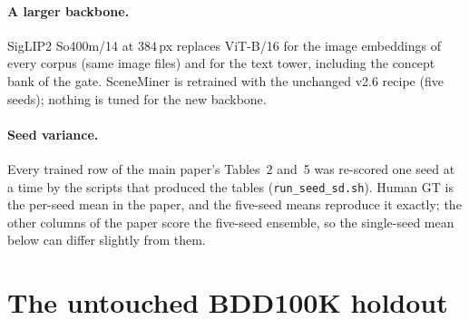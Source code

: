 \documentclass[10pt,letterpaper]{article}
\begin{document}
\begin{table}[!ht]\centering\small
\caption{\textbf{SigLIP2 top-50 $\rightarrow$ Qwen2.5-VL per query}, mAP, against
SceneMiner (holdout: portable mode, as in Table~2). $\Delta$: SceneMiner minus reranker.}
\label{tab:vlmrr}
\resizebox{0.85\textwidth}{!}{%
%
}
\end{table}

\paragraph{A larger backbone.} SigLIP2 So400m/14 at $384$\,px replaces ViT-B/16 for
the image embeddings of every corpus (same image files) and for the text tower,
including the concept bank of the gate. SceneMiner is retrained with the unchanged
v2.6 recipe (five seeds); nothing is tuned for the new backbone.

\begin{table}[!ht]\centering\small
\caption{\textbf{Backbone scale.} Zero-shot SigLIP2 and SceneMiner on ViT-B/16 (the
paper) and So400m/14. On So400m, SceneMiner leads its backbone on human GT
($+0.241$) and the suite, is level with it on BDD100K ($+0.027$, $p=0.73$) and the
holdout ($-0.007$, $p=0.60$), and is below it on Stratum-5 conjunctions ($-0.050$,
$p=0.021$).}
\label{tab:backbone}
\resizebox{\textwidth}{!}{%
%
}
\end{table}

\paragraph{Seed variance.} Every trained row of the main paper's Tables~2 and~5 was re-scored one
seed at a time by the scripts that produced the tables
(\texttt{run\_seed\_sd.sh}). Human GT is the per-seed mean in the paper, and the
five-seed means reproduce it exactly; the other columns of the paper score the
five-seed ensemble, so the single-seed mean below can differ slightly from them.

\begin{table}[!ht]\centering\small
\caption{\textbf{Five single-seed models}, mean $\pm$ sd.}
\label{tab:seedsd}
\resizebox{\textwidth}{!}{%
%
}
\end{table}

\section{The untouched BDD100K holdout}
\label{sec:holdout}
\end{document}
